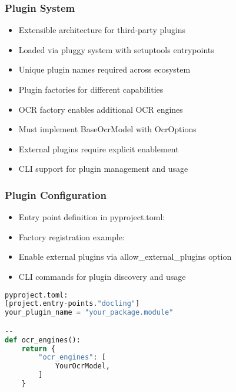 \begin{frame}[fragile]\frametitle{Plugin System}
      \begin{itemize}
	\item Extensible architecture for third-party plugins
	\item Loaded via pluggy system with setuptools entrypoints
	\item Unique plugin names required across ecosystem
	\item Plugin factories for different capabilities
	\item OCR factory enables additional OCR engines
	\item Must implement BaseOcrModel with OcrOptions
	\item External plugins require explicit enablement
	\item CLI support for plugin management and usage
	  \end{itemize}
\end{frame}

\begin{frame}[fragile]\frametitle{Plugin Configuration}
    \begin{itemize}
	\item Entry point definition in pyproject.toml:
	\item Factory registration example:
	\item Enable external plugins via allow\_external\_plugins option
	\item CLI commands for plugin discovery and usage
	\end{itemize}
	  
\begin{lstlisting}[language=Python, basicstyle=\tiny]
pyproject.toml:
[project.entry-points."docling"]
your_plugin_name = "your_package.module"

--
def ocr_engines():
    return {
        "ocr_engines": [
            YourOcrModel,
        ]
    }
\end{lstlisting}	  
\end{frame}

